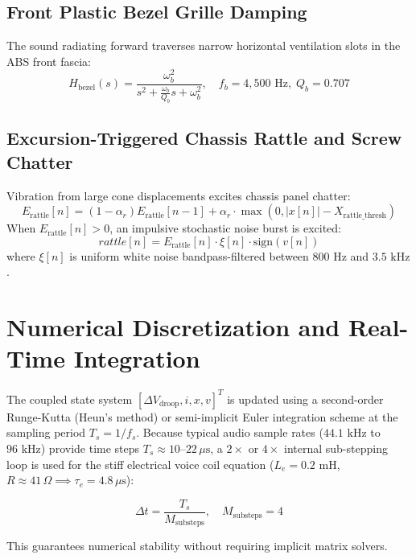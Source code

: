 \documentclass[11pt,a4paper]{article}
\begin{document}
\subsection{Front Plastic Bezel Grille Damping}
The sound radiating forward traverses narrow horizontal ventilation slots in the ABS front fascia:
\begin{equation}
H_{\text{bezel}}(s) = \frac{\omega_b^2}{s^2 + \frac{\omega_b}{Q_b} s + \omega_b^2}, \quad f_b = 4,500\text{ Hz}, \; Q_b = 0.707
\end{equation}

\subsection{Excursion-Triggered Chassis Rattle and Screw Chatter}
Vibration from large cone displacements excites chassis panel chatter:
\begin{equation}
E_{\text{rattle}}[n] = (1 - \alpha_r) E_{\text{rattle}}[n-1] + \alpha_r \cdot \max(0, |x[n]| - X_{\text{rattle\_thresh}})
\end{equation}
When $E_{\text{rattle}}[n] > 0$, an impulsive stochastic noise burst is excited:
\begin{equation}
rattle[n] = E_{\text{rattle}}[n] \cdot \xi[n] \cdot \text{sign}(v[n])
\end{equation}
where $\xi[n]$ is uniform white noise bandpass-filtered between $800\text{ Hz}$ and $3.5\text{ kHz}$.

\section{Numerical Discretization and Real-Time Integration}
The coupled state system $[\Delta V_{\text{droop}}, i, x, v]^T$ is updated using a second-order Runge-Kutta (Heun's method) or semi-implicit Euler integration scheme at the sampling period $T_s = 1/f_s$. Because typical audio sample rates ($44.1\text{ kHz}$ to $96\text{ kHz}$) provide time steps $T_s \approx 10\text{--}22\,\mu\text{s}$, a $2\times$ or $4\times$ internal sub-stepping loop is used for the stiff electrical voice coil equation ($L_e = 0.2\text{ mH}$, $R \approx 41\,\Omega \implies \tau_e = 4.8\,\mu\text{s}$):

\begin{equation}
\Delta t = \frac{T_s}{M_{\text{substeps}}}, \quad M_{\text{substeps}} = 4
\end{equation}

This guarantees numerical stability without requiring implicit matrix solvers.
\end{document}
